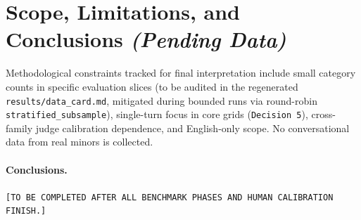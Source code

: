 \documentclass[11pt,letterpaper]{article}
\begin{document}
\section{Scope, Limitations, and Conclusions \textit{(Pending Data)}}

Methodological constraints tracked for final interpretation include small category counts in specific evaluation slices (to be audited in the regenerated \texttt{results/data\_card.md}, mitigated during bounded runs via round-robin \texttt{stratified\_subsample}), single-turn focus in core grids (\texttt{Decision 5}), cross-family judge calibration dependence, and English-only scope. No conversational data from real minors is collected.

\paragraph{Conclusions.} \texttt{[TO BE COMPLETED AFTER ALL BENCHMARK PHASES AND HUMAN CALIBRATION FINISH.]}



\end{document}
